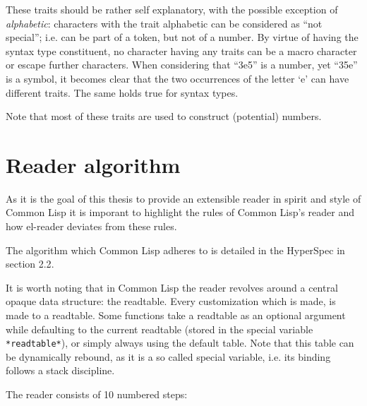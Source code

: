 \documentclass[a4paper,10pt,twoside]{report}
\newcommand{\cl}{Common Lisp}
\newcommand{\elr}{el-reader}
\newcommand{\sym}[1]{\texttt{#1}}
\begin{document}
These traits should be rather self explanatory, with the possible exception of
\emph{alphabetic}: characters with the trait alphabetic can be considered as
``not special''; i.e. can be part of a token, but not of a number.  By virtue of
having the syntax type constituent, no character having any traits can be a
macro character or escape further characters.  When considering that ``3e5'' is
a number, yet ``35e'' is a symbol, it becomes clear that the two occurrences of
the letter `e' can have different traits.  The same holds true for syntax types.

Note that most of these traits are used to construct (potential) numbers.

\section{Reader algorithm}
\label{subsec:read-algo}

As it is the goal of this thesis to provide an extensible reader in spirit and
style of \cl{} it is imporant to highlight the rules of \cl{}’s reader and how
\elr{} deviates from these rules.

The algorithm which \cl{} adheres to is detailed in the HyperSpec in section
2.2\cite{hyperspec}.

It is worth noting that in \cl{} the reader revolves around a central opaque
data structure: the readtable.  Every customization which is made, is made to a
readtable.  Some functions take a readtable as an optional argument while
defaulting to the current readtable (stored in the special variable
\sym{*readtable*}), or simply always using the default table.  Note that this
table can be dynamically rebound, as it is a so called special variable,
i.e. its binding follows a stack discipline.

The reader consists of 10 numbered steps:
\end{document}
